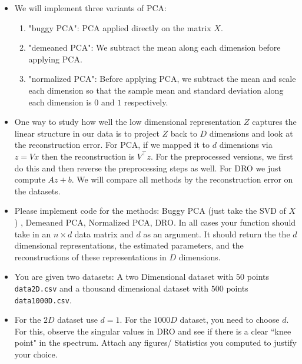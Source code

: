 \documentclass[a4paper]{article}
\theoremstyle{definition}
\begin{document}
\begin{itemize}
	\item We will implement three variants of PCA:
	      \begin{enumerate}
		      \item "buggy PCA": PCA applied directly on the matrix $X$.
		      \item "demeaned PCA": We subtract the mean along each dimension before applying PCA.
		      \item "normalized PCA": Before applying PCA, we subtract the mean and scale each dimension so that the sample  mean and standard deviation along each dimension is $0$ and $1$ respectively.

	      \end{enumerate}



	\item
	      One way to study how well the low dimensional representation $Z$ captures the linear
	      structure in our data is to project $Z$ back to $D$ dimensions and look at the reconstruction
	      error. For PCA, if we mapped it to $d$ dimensions via $z = Vx$ then the
	      reconstruction is $V^\top z$. For the preprocessed versions, we first do this and then
	      reverse the preprocessing steps as well. For DRO  we just compute $Az + b$.
	      We will compare all methods by the reconstruction error on the datasets.

	\item
	      Please implement code for the methods: Buggy PCA (just take the SVD of $X$)
	      , Demeaned PCA,
	      Normalized PCA, DRO. In all cases your function should take in
	      an $n \times d$ data matrix and $d$ as an argument. It should return the
	      the $d$ dimensional representations, the estimated parameters, and the
	      reconstructions of these representations in $D$ dimensions.

	\item
	      You are given two datasets: A two Dimensional dataset with $50$ points
	      \texttt{data2D.csv} and a thousand dimensional dataset with $500$ points
	      \texttt{data1000D.csv}.

	\item
	      For the $2D$ dataset use $d=1$. For the $1000D$ dataset, you need to choose
	      $d$. For this, observe the singular values in DRO and see if there is a clear
	      ``knee point" in the spectrum.
	      Attach any figures/ Statistics you computed to justify your choice.


\end{itemize}
\end{document}
